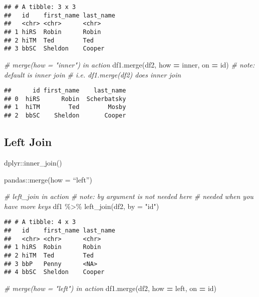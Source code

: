 \documentclass[
]{book}
\newenvironment{Shaded}{\begin{snugshade}}{\end{snugshade}}
\newcommand{\AttributeTok}[1]{\textcolor[rgb]{0.77,0.63,0.00}{#1}}
\newcommand{\CommentTok}[1]{\textcolor[rgb]{0.56,0.35,0.01}{\textit{#1}}}
\newcommand{\FunctionTok}[1]{\textcolor[rgb]{0.00,0.00,0.00}{#1}}
\newcommand{\NormalTok}[1]{#1}
\newcommand{\OperatorTok}[1]{\textcolor[rgb]{0.81,0.36,0.00}{\textbf{#1}}}
\newcommand{\SpecialCharTok}[1]{\textcolor[rgb]{0.00,0.00,0.00}{#1}}
\newcommand{\StringTok}[1]{\textcolor[rgb]{0.31,0.60,0.02}{#1}}
\begin{document}
\begin{verbatim}
## # A tibble: 3 x 3
##   id    first_name last_name
##   <chr> <chr>      <chr>    
## 1 hiRS  Robin      Robin    
## 2 hiTM  Ted        Ted      
## 3 bbSC  Sheldon    Cooper
\end{verbatim}

\begin{Shaded}
\begin{Highlighting}[]
\CommentTok{\# merge(how = "inner") in action}
\NormalTok{df1.merge(df2, how }\OperatorTok{=} \StringTok{\textquotesingle{}inner\textquotesingle{}}\NormalTok{, on }\OperatorTok{=} \StringTok{\textquotesingle{}id\textquotesingle{}}\NormalTok{)}
\CommentTok{\# note: default is inner join}
\CommentTok{\# i.e. df1.merge(df2) does inner join}
\end{Highlighting}
\end{Shaded}

\begin{verbatim}
##      id first_name    last_name
## 0  hiRS      Robin  Scherbatsky
## 1  hiTM        Ted        Mosby
## 2  bbSC    Sheldon       Cooper
\end{verbatim}

\hypertarget{left-join}{%
\subsection{Left Join}\label{left-join}}

dplyr::inner\_join()

pandas::merge(how = ``left'')

\begin{Shaded}
\begin{Highlighting}[]
\CommentTok{\# left\_join in action}
\CommentTok{\# note: by argument is not needed here}
\CommentTok{\# needed when you have more keys}
\NormalTok{df1 }\SpecialCharTok{\%\textgreater{}\%} \FunctionTok{left\_join}\NormalTok{(df2, }\AttributeTok{by =} \StringTok{"id"}\NormalTok{)}
\end{Highlighting}
\end{Shaded}

\begin{verbatim}
## # A tibble: 4 x 3
##   id    first_name last_name
##   <chr> <chr>      <chr>    
## 1 hiRS  Robin      Robin    
## 2 hiTM  Ted        Ted      
## 3 bbP   Penny      <NA>     
## 4 bbSC  Sheldon    Cooper
\end{verbatim}

\begin{Shaded}
\begin{Highlighting}[]
\CommentTok{\# merge(how = "left") in action}
\NormalTok{df1.merge(df2, how }\OperatorTok{=} \StringTok{\textquotesingle{}left\textquotesingle{}}\NormalTok{, on }\OperatorTok{=} \StringTok{\textquotesingle{}id\textquotesingle{}}\NormalTok{)}
\end{Highlighting}
\end{Shaded}
\end{document}
